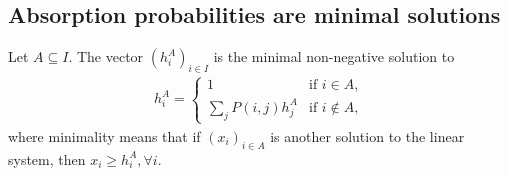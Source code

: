 \documentclass[a4paper,11pt]{article}
\begin{document}
\subsection{Absorption probabilities are minimal solutions}
\begin{theorem}
	Let $A \subseteq I$. The vector $(h_i^A)_{i \in I}$ is the minimal non-negative solution to
	\begin{align*}
		h_i^A = \begin{cases}
			1 &\mbox{if } i  \in A, \\
			\sum_{j} P(i, j) h_j^A &\mbox{if } i \not \in A,
		   \end{cases}
	\end{align*}
	where minimality means that if $(x_i)_{i \in A}$ is another solution to the linear system, then $x_i \ge h_i^A, \forall i$.
\end{theorem}
\end{document}
